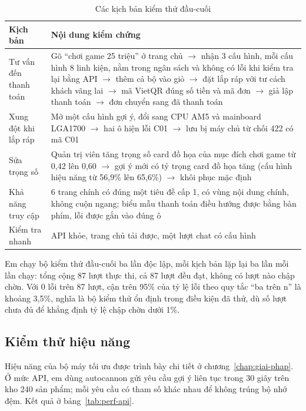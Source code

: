 \begin{table}[H]
\centering\footnotesize\renewcommand{\arraystretch}{1.15}
\begin{tabular}{|L{3cm}|L{10.7cm}|}
\hline
\textbf{Kịch bản} & \textbf{Nội dung kiểm chứng} \\ \hline
Tư vấn đến thanh toán & Gõ ``chơi game 25 triệu'' ở trang chủ $\rightarrow$ nhận 3 cấu hình, mỗi cấu hình 8 linh kiện, nằm trong ngân sách và không có lỗi khi kiểm tra lại bằng API $\rightarrow$ thêm cả bộ vào giỏ $\rightarrow$ đặt lắp ráp với tư cách khách vãng lai $\rightarrow$ mã VietQR đúng số tiền và mã đơn $\rightarrow$ giả lập thanh toán $\rightarrow$ đơn chuyển sang đã thanh toán \\ \hline
Xung đột khi lắp ráp & Mở một cấu hình gợi ý, đổi sang CPU AM5 và mainboard LGA1700 $\rightarrow$ hai ô hiện lỗi C01 $\rightarrow$ lưu bị máy chủ từ chối 422 có mã C01 \\ \hline
Sửa trọng số & Quản trị viên tăng trọng số card đồ họa của mục đích chơi game từ 0,42 lên 0,60 $\rightarrow$ gợi ý mới có tỷ trọng card đồ họa tăng (cấu hình hiệu năng từ 56,9\% lên 65,6\%) $\rightarrow$ khôi phục mặc định \\ \hline
Khả năng truy cập & 6 trang chính có đúng một tiêu đề cấp 1, có vùng nội dung chính, không cuộn ngang; biểu mẫu thanh toán điều hướng được bằng bàn phím, lỗi được gắn vào đúng ô \\ \hline
Kiểm tra nhanh & API khỏe, trang chủ tải được, một lượt chat có cấu hình \\ \hline
\end{tabular}
\caption{Các kịch bản kiểm thử đầu-cuối}
\label{tab:e2e}
\end{table}

Em chạy bộ kiểm thử đầu-cuối ba lần độc lập, mỗi kịch bản lặp lại ba lần mỗi lần chạy: tổng cộng 87 lượt thực thi, cả 87 lượt đều đạt, không có lượt nào chập chờn. Với 0 lỗi trên 87 lượt, cận trên 95\% của tỷ lệ lỗi theo quy tắc ``ba trên n'' là khoảng 3,5\%, nghĩa là bộ kiểm thử ổn định trong điều kiện đã thử, dù số lượt chưa đủ để khẳng định tỷ lệ chập chờn dưới 1\%.

\subsection{Kiểm thử hiệu năng}

Hiệu năng của bộ máy tối ưu được trình bày chi tiết ở chương~\ref{chap:giai-phap}. Ở mức API, em dùng autocannon gửi yêu cầu gợi ý liên tục trong 30 giây trên kho 240 sản phẩm; mỗi yêu cầu có tham số khác nhau để không trúng bộ nhớ đệm. Kết quả ở bảng~\ref{tab:perf-api}.

